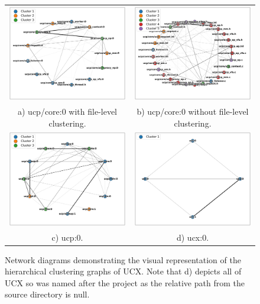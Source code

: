 \begin{figure}[ht]
    \centering
    \begin{tabular}{c c }
        \includegraphics[width=0.48\linewidth]{figures/graph_design_examples/ucp_core_clustered.png}
        & \includegraphics[width=0.48\linewidth]{figures/graph_design_examples/ucp_core.png} \\
        a) ucp/core:0 with file-level clustering.
        & b) ucp/core:0 without file-level clustering. \\
        \includegraphics[width=0.48\linewidth]{figures/graph_design_examples/ucp.png}
        & \includegraphics[width=0.48\linewidth]{figures/graph_design_examples/ucx.png} \\
        c) ucp:0. & d) ucx:0. \\
    \end{tabular}
    \caption{Network diagrams demonstrating the visual representation of the hierarchical clustering graphs of UCX. Note that d) depicts all of UCX so was named after the project as the relative path from the source directory is null.}
    \label{fig:graph_example}
\end{figure}

